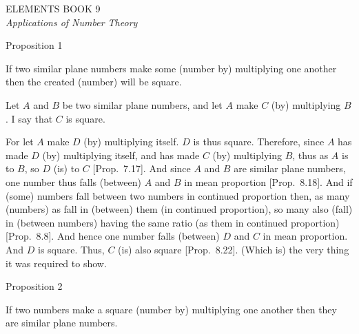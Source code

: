 \pagestyle{plain}
\begin{center}
{\Huge ELEMENTS BOOK 9}\\
\spa\spa\spa
{\huge\it Applications of Number Theory}
\end{center}\newpage

\pagestyle{fancy}
\cfoot{\gr{\thepage}}

\begin{center}
{\large Proposition 1}
\end{center}

If two similar plane numbers make some (number by) multiplying one another then the created (number) will be  square.

\epsfysize=1.2in
\centerline{}

Let $A$ and $B$ be two similar plane numbers, and let $A$ make $C$
(by) multiplying $B$. I say that $C$ is square.

For let $A$ make $D$ (by) multiplying itself. $D$ is thus square. Therefore, since $A$ has made $D$ (by) multiplying itself, and
has made $C$ (by) multiplying $B$, thus as $A$ is to $B$, so $D$ (is) to $C$ [Prop.~7.17]. And since $A$ and $B$ are similar
plane numbers, one number thus falls (between) $A$ and $B$ in mean
proportion [Prop.~8.18]. And if (some) numbers fall between two  numbers in continued proportion then, as many (numbers)
as fall in  (between) them (in continued proportion), so many also (fall) in (between numbers) having
the same ratio (as them in continued proportion)  [Prop.~8.8].
And hence one number falls (between) $D$ and $C$ in mean proportion.
And $D$ is  square. Thus, $C$ (is) also  square [Prop.~8.22]. (Which is)
the very thing it was required to show.


\begin{center}
{\large Proposition 2}
\end{center}

If two numbers make a square (number by)
multiplying one another then they are similar plane numbers.

\epsfysize=1.3in
\centerline{}

